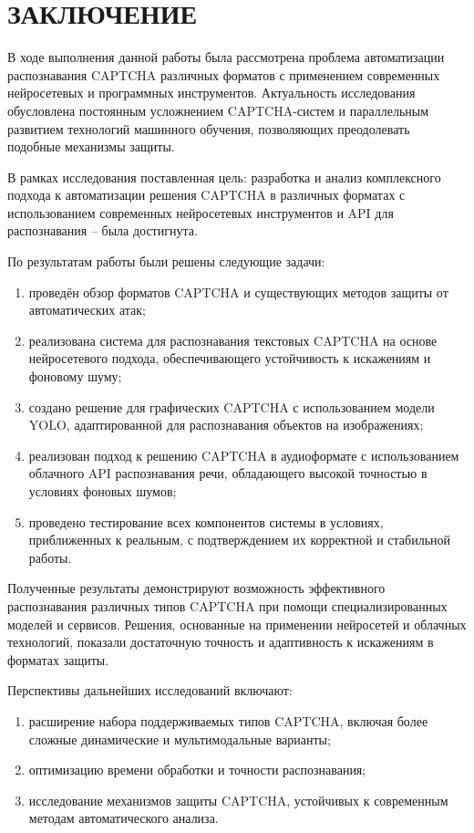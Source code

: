 \chapter*{ЗАКЛЮЧЕНИЕ}

В ходе выполнения данной работы была рассмотрена проблема автоматизации 
распознавания CAPTCHA различных форматов с применением современных нейросетевых и 
программных инструментов. Актуальность исследования обусловлена постоянным 
усложнением CAPTCHA-систем и параллельным развитием технологий машинного 
обучения, позволяющих преодолевать подобные механизмы защиты.

В рамках исследования поставленная цель: разработка и анализ комплексного подхода 
к автоматизации решения CAPTCHA в различных форматах с использованием современных 
нейросетевых инструментов и API для распознавания -- была достигнута.

По результатам работы были решены следующие задачи:

\begin{enumerate}
    \item проведён обзор форматов CAPTCHA и существующих методов защиты от 
    автоматических атак;
    \item реализована система для распознавания текстовых CAPTCHA на основе 
    нейросетевого подхода, обеспечивающего устойчивость к искажениям и фоновому 
    шуму;
    \item создано решение для графических CAPTCHA с использованием модели YOLO, 
    адаптированной для распознавания объектов на изображениях;
    \item реализован подход к решению CAPTCHA в аудиоформате с использованием 
    облачного API распознавания речи, обладающего высокой точностью в условиях 
    фоновых шумов;
    \item проведено тестирование всех компонентов системы в условиях, 
    приближенных к реальным, с подтверждением их корректной и стабильной работы.
\end{enumerate}

Полученные результаты демонстрируют возможность эффективного распознавания 
различных типов CAPTCHA при помощи специализированных моделей и сервисов. 
Решения, основанные на применении нейросетей и облачных технологий, показали 
достаточную точность и адаптивность к искажениям в форматах защиты.

Перспективы дальнейших исследований включают:

\begin{enumerate}
    \item расширение набора поддерживаемых типов CAPTCHA, включая более сложные 
    динамические и мультимодальные варианты;
    \item оптимизацию времени обработки и точности распознавания;
    \item исследование механизмов защиты CAPTCHA, устойчивых к современным 
    методам автоматического анализа.
\end{enumerate}

